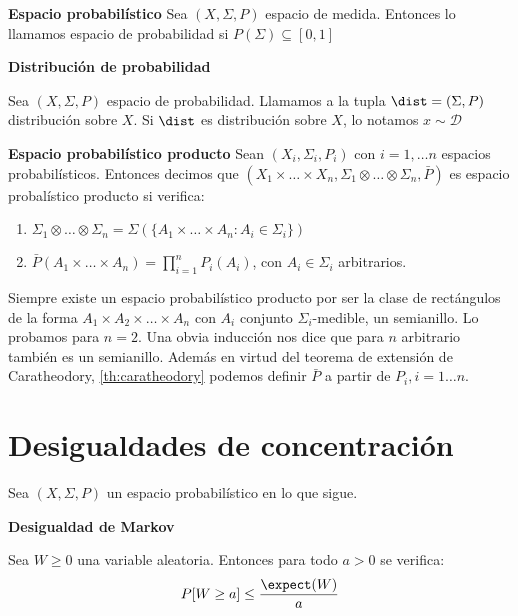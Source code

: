\begin{definition} \textbf{Espacio probabilístico}
 Sea $(X, \Sigma, P)$ espacio de medida. Entonces lo llamamos espacio de probabilidad si $P(\Sigma)\subseteq [0,1]$
\end{definition}


\begin{definition} \textbf{Distribución de probabilidad}

 Sea $(X, \Sigma, P)$ espacio de probabilidad. Llamamos a la tupla $\dist = (\Sigma,P)$ distribución sobre $X$. 
 Si $\dist$ es distribución sobre $X$, lo notamos $x\sim \mathcal{D}$
\end{definition}

\begin{definition} \textbf{Espacio probabilístico producto}
 Sean $(X_i, \Sigma_i, P_i)$ con $i=1,\ldots n$ espacios probabilísticos. Entonces decimos que 
 $(X_1 \times \ldots \times X_n, \Sigma_1 \otimes \ldots \otimes \Sigma_n, \bar{P})$ es espacio probalístico 
 producto si verifica:
 
 \begin{enumerate}[i]
  \item $\Sigma_1 \otimes \ldots \otimes \Sigma_n = \Sigma\left(\{A_1 \times \ldots \times A_n: A_i\in \Sigma_i\}\right)$
  \item $\bar{P}(A_1 \times \ldots \times A_n) = \prod_{i=1}^n P_i(A_i)$, con $A_i\in \Sigma_i$ arbitrarios.
 \end{enumerate}
\end{definition}

Siempre existe un espacio probabilístico producto por ser la clase de rectángulos de la forma 
$A_1 \times A_2 \times \ldots \times A_n$ con $A_i$ conjunto $\Sigma_i$-medible, un semianillo. Lo probamos
para $n=2$. Una obvia inducción nos dice que para $n$ arbitrario también es un semianillo. Además en virtud del
teorema de extensión de Caratheodory, \ref{th:caratheodory} podemos definir $\bar{P}$ a partir de $P_i, i=1\ldots n$.

\section{Desigualdades de concentración}
Sea $(X,\Sigma,P)$ un espacio probabilístico en lo que sigue.

\begin{lemma} \textbf{Desigualdad de Markov}

Sea $W \ge 0$ una variable aleatoria. Entonces para todo $a > 0$ se verifica:
\[P[W \ge a] \le \frac{\expect(W)}{a}\]

\label{ineq:markov}
\end{lemma}

